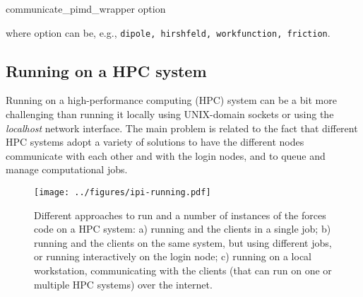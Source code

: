 \documentclass[11pt,english,fleqn]{report}
\newenvironment{code}{%
\footnotesize
\verbatim
}{
\endverbatim
\normalsize
}
\begin{document}
\begin{code}
communicate_pimd_wrapper option
\end{code}
where option can be, e.g., {\small {\tt dipole, hirshfeld, workfunction, friction}}.

\subsection{Running on a HPC system}\label{hpc}

Running \ipi on a high-performance computing (HPC) system can be a bit more challenging
than running it locally using UNIX-domain sockets or using the \emph{localhost}
network interface.
The main problem is related to the fact that different HPC systems adopt
a variety of solutions to have the different nodes communicate with each other
and with the login nodes, and to queue and manage computational jobs.

\begin{figure}[hbt]
\centering\texttt{[image: ../figures/ipi-running.pdf]}
\caption{\label{fig:running} Different approaches to run \ipi and a number of
instances of the forces code on a HPC system: a) running \ipi and the clients in a single
job; b) running \ipi and the clients on the same system, but using different jobs, or running
\ipi interactively on the login node; c) running \ipi on a local workstation, communicating
with the clients (that can run on one or multiple HPC systems) over the internet. }
\end{figure}
\end{document}
